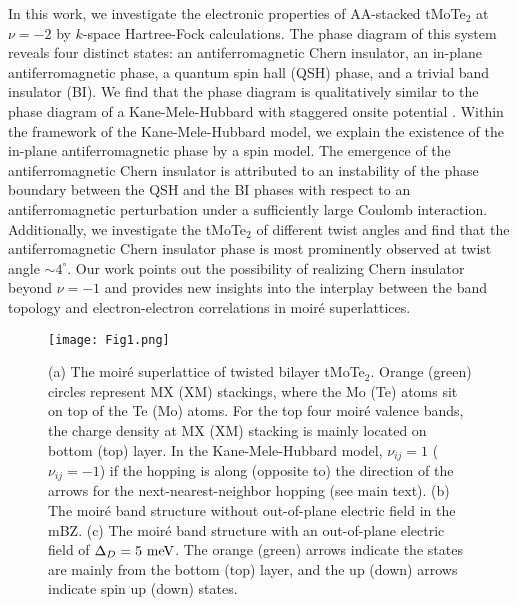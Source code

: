\documentclass[twocolumn,aps,prl,superscriptaddress]{revtex4-2}
\begin{document}
In this work, we investigate the electronic properties of AA-stacked tMoTe$_2$ at $\nu=-2$ by $k$-space Hartree-Fock calculations. The phase diagram of this system reveals four distinct states: an antiferromagnetic Chern insulator, an in-plane antiferromagnetic phase, a quantum spin hall (QSH) phase, and a trivial band insulator (BI). We find that the phase diagram is qualitatively similar to the phase diagram of a Kane-Mele-Hubbard with staggered onsite potential \cite{jiang2018antiferromagnetic}. Within the framework of the Kane-Mele-Hubbard model, we explain the existence of the in-plane antiferromagnetic phase by a spin model. The emergence of the antiferromagnetic Chern insulator is attributed to an instability of the phase boundary between the QSH and the BI phases with respect to an antiferromagnetic perturbation under a sufficiently large Coulomb interaction. Additionally, we investigate the tMoTe$_2$ of different twist angles and find that the antiferromagnetic Chern insulator phase is most prominently observed at twist angle $\sim 4^\circ$. Our work points out the possibility of realizing Chern insulator beyond $\nu=-1$ and provides new insights into the interplay between the band topology and electron-electron correlations in moir\'e superlattices. 

\begin{figure}
\centering
\texttt{[image: Fig1.png]}
\caption{(a) The moir\'e superlattice of twisted bilayer tMoTe$_2$. Orange (green) circles represent MX (XM) stackings, where the Mo (Te) atoms sit on top of the Te (Mo) atoms. For the top four moir\'e valence bands, the charge density at MX (XM) stacking is mainly located on bottom (top) layer. In the Kane-Mele-Hubbard model, $\nu_{ij} = 1$ ($\nu_{ij} = -1$) if the hopping is along (opposite to) the direction of the arrows for the next-nearest-neighbor hopping (see main text). (b) The moir\'e band structure without out-of-plane electric field in the mBZ. (c) The moir\'e band structure with an out-of-plane electric field of $\Delta_D = 5~\rm{meV}$. The orange (green) arrows indicate the states are mainly from the bottom (top) layer, and the up (down) arrows indicate spin up (down) states.\label{fig:fig1}}
\end{figure}
\end{document}
